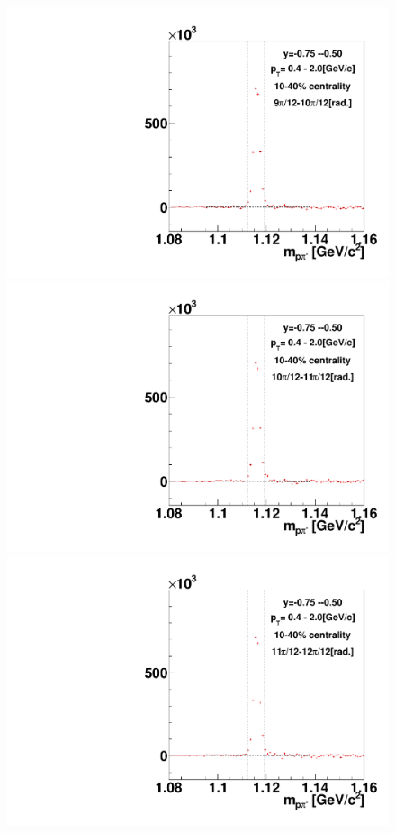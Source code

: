 \begin{figure}[h]
\includegraphics[width=0.14\linewidth]{chapterX/fig/ld_v2_sig/kf_ptslice0_cent1_ld_flow_phi10_rap4.pdf}
\includegraphics[width=0.14\linewidth]{chapterX/fig/ld_v2_sig/kf_ptslice0_cent1_ld_flow_phi11_rap4.pdf}
\includegraphics[width=0.14\linewidth]{chapterX/fig/ld_v2_sig/kf_ptslice0_cent1_ld_flow_phi12_rap4.pdf}



\end{figure}
